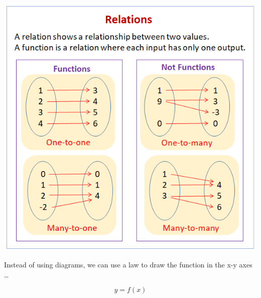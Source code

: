 \documentclass[]{beamer}
\begin{document}
\begin{frame}



   \vspace{3mm}
 
    \begin{center}
       \includegraphics[height=3.in]{images/relation-function.png}
     \end{center}
 
 
  \end{frame}
 


 
 \begin{frame}


Instead of using diagrams, we can use a law to draw the function in the x-y axes \dots
\pause

\begin{equation*}
  \boxed{ y=f(x)}
\end{equation*}
 
  \end{frame}
 

\end{document}
